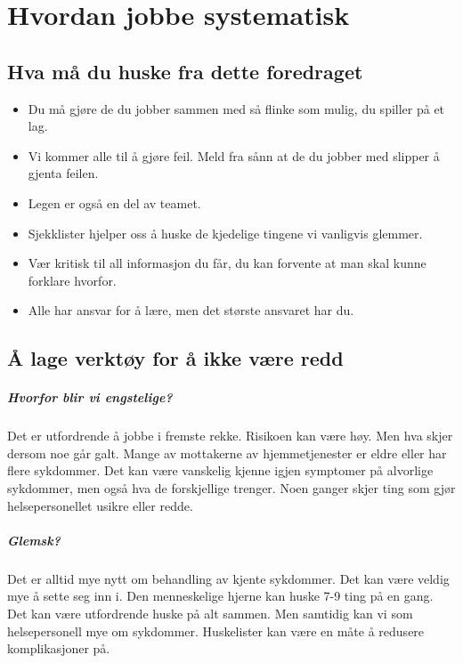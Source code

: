 	\chapter{Hvordan jobbe systematisk}
		\section{Hva må du huske fra dette foredraget}
			\begin{itemize}
				\item Du må gjøre de du jobber sammen med så flinke som mulig, du spiller på et lag.\\
				\item Vi kommer alle til å gjøre feil. Meld fra sånn at de du jobber med slipper å gjenta feilen.\\
				\item Legen er også en del av teamet.\\
				\item Sjekklister hjelper oss å huske de kjedelige tingene vi vanligvis glemmer.\\
				\item Vær kritisk til all informasjon du får, du kan forvente at man skal kunne forklare hvorfor.\\
				\item Alle har ansvar for å lære, men det største ansvaret har du.\\
			\end{itemize}
		\section{Å lage verktøy for å ikke være redd}
			\paragraph{Hvorfor blir vi engstelige?\\}
				Det er utfordrende å jobbe i fremste rekke. Risikoen kan være høy. Men hva skjer dersom noe går galt. Mange av mottakerne av hjemmetjenester er eldre eller har flere sykdommer. Det kan være vanskelig kjenne igjen symptomer på alvorlige sykdommer, men også hva de forskjellige trenger. Noen ganger skjer ting som gjør helsepersonellet usikre eller redde.
			\paragraph{Glemsk?\\}
				Det er alltid mye nytt om behandling av kjente sykdommer. Det kan være veldig mye å sette seg inn i. Den menneskelige hjerne kan huske 7-9 ting på en gang. Det kan være utfordrende huske på alt sammen. Men samtidig kan vi som helsepersonell mye om sykdommer. Huskelister kan være en måte å redusere komplikasjoner på\cite{FA-gawande}.
